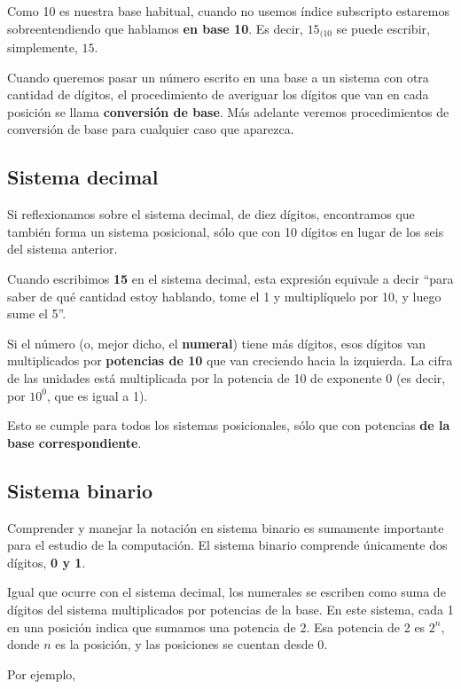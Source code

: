 \documentclass[spanish,A4,]{article}
\begin{document}
Como 10 es nuestra base habitual, cuando no usemos índice subscripto
estaremos sobreentendiendo que hablamos \textbf{en base 10}. Es decir,
\textbf{$15_{(10}$} se puede escribir, simplemente, \textbf{$15$}.

Cuando queremos pasar un número escrito en una base a un sistema con
otra cantidad de dígitos, el procedimiento de averiguar los dígitos que
van en cada posición se llama \textbf{conversión de base}. Más adelante
veremos procedimientos de conversión de base para cualquier caso que
aparezca.

\subsection{Sistema decimal}\label{sistema-decimal}

Si reflexionamos sobre el sistema decimal, de diez dígitos, encontramos
que también forma un sistema posicional, sólo que con 10 dígitos en
lugar de los seis del sistema anterior.

Cuando escribimos \textbf{15} en el sistema decimal, esta expresión
equivale a decir ``para saber de qué cantidad estoy hablando, tome el 1
y multiplíquelo por 10, y luego sume el 5''.

Si el número (o, mejor dicho, el \textbf{numeral}) tiene más dígitos,
esos dígitos van multiplicados por \textbf{potencias de 10} que van
creciendo hacia la izquierda. La cifra de las unidades está multiplicada
por la potencia de 10 de exponente 0 (es decir, por $10^0$, que es igual
a 1).

Esto se cumple para todos los sistemas posicionales, sólo que con
potencias \textbf{de la base correspondiente}.

\subsection{Sistema binario}\label{sistema-binario}

Comprender y manejar la notación en sistema binario es sumamente
importante para el estudio de la computación. El sistema binario
comprende únicamente dos dígitos, \textbf{0 y 1}.

Igual que ocurre con el sistema decimal, los numerales se escriben como
suma de dígitos del sistema multiplicados por potencias de la base. En
este sistema, cada 1 en una posición indica que sumamos una potencia de
2. Esa potencia de 2 es $2^n$, donde $n$ es la posición, y las
posiciones se cuentan desde 0.

Por ejemplo,
\end{document}
